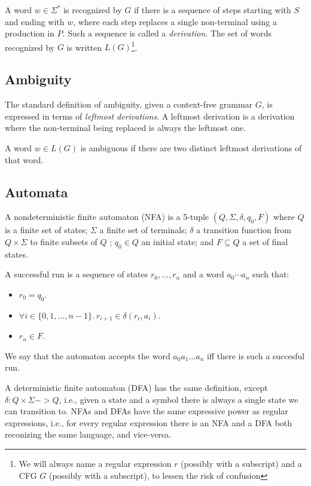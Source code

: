 \documentclass[acmsmall,review,anonymous]{acmart}\settopmatter{printfolios=true,printccs=false,printacmref=false}
\newcommand{\T}{\Sigma} %
\begin{document}
 A word $w \in \T^{*}$ is recognized by $G$ if there is a sequence of steps starting with $S$ and ending with $w$, where each step replaces a single non-terminal using a production in $P$. Such a sequence is called a \emph{derivation}. The set of words recognized by $G$ is written $L(G)$\footnote{We will always name a regular expression $r$ (possibly with a subscript) and a CFG $G$ (possibly with a subscript), to lessen the risk of confusion}.

\subsection{Ambiguity} \label{sec:preliminaries-ambiguity}

The standard definition of ambiguity, given a context-free grammar $G$, is expressed in terms of \emph{leftmost derivations}. A leftmost derivation is a derivation where the non-terminal being replaced is always the leftmost one.

\begin{definition}
A word $w \in L(G)$ is ambiguous if there are two distinct leftmost derivations of that word.
\end{definition}

\subsection{Automata} \label{sec:preliminaries-automata}

A nondeterministic finite automaton (NFA) is a 5-tuple $(Q, \T, \delta, q_0, F)$ where $Q$ is a finite set of states; $\T$ a finite set of terminals; $\delta$ a transition function from $Q \times \T$ to finite subsets of $Q$ ; $q_0 \in Q$ an initial state; and $F \subseteq Q$ a set of final states.

A successful run is a sequence of states $r_0, \ldots, r_n$ and a word $a_0\cdots a_n$ such that:

\begin{itemize}
\item $r_0 = q_0$.
\item $\forall i \in \{0, 1, \ldots, n-1\}.\ r_{i+1} \in \delta(r_i, a_i)$.
\item $r_n \in F$.
\end{itemize}

\noindent We say that the automaton accepts the word $a_0a_1\ldots a_n$ iff there is such a succesful run.

A deterministic finite automaton (DFA) has the same definition, except $\delta : Q \times \Sigma -> Q$, i.e., given a state and a symbol there is always a single state we can transition to. NFAs and DFAs have the same expressive power as regular expressions, i.e., for every regular expression there is an NFA and a DFA both reconizing the same language, and vice-versa. %
\end{document}
